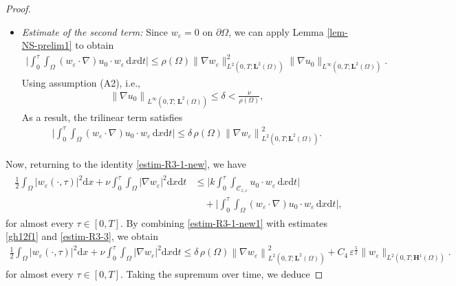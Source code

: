 \documentclass[a4paper,12pt,reqno,natbib]{amsart}
\newcommand{\dx} {\displaystyle\mathrm{d}x}
\newcommand{\dt} {\displaystyle\mathrm{d}t}
\def\H{\textbf{H}}
\def\L{\textbf{L}}
\begin{document}
\begin{proof}
\begin{itemize}
    \item[$-$] \emph{Estimate of the second term:}  
    Since \( w_\varepsilon = 0 \) on \( \partial \Omega \), we can apply Lemma \ref{lem-NS-prelim1} to obtain  
    \begin{align}
        \big| \int_0^\tau \int_\Omega (w_\varepsilon \cdot \nabla) u_0 \cdot w_\varepsilon \, \dx\dt \big|  
        \leq \rho(\Omega) \big\|\nabla w_\varepsilon\big\|_{L^2(0,T;\L^2(\Omega))}^2 \big\|\nabla u_0\big\|_{L^\infty(0,T;\L^2(\Omega))}.
    \end{align}
    Using assumption (A2), i.e.,  
    \begin{align*}
        \left\|\nabla u_0\right\|_{L^\infty(0,T;\,\L^2(\Omega))} \leq \delta < \frac{\nu}{\rho(\Omega)},
    \end{align*}
    As a result, the trilinear term satisfies  
    \begin{align}\label{estim-R3-3}
        \big| \int_0^\tau \int_\Omega (w_\varepsilon \cdot \nabla) u_0 \cdot w_\varepsilon \, \dx\dt \big|  
        \leq {\delta} \, \rho(\Omega)  \left\|\nabla w_\varepsilon\right\|^2_{L^2(0,T;\L^2(\Omega))}.
    \end{align}
\end{itemize}
Now, returning to the identity  \eqref{estim-R3-1-new}, we have
\begin{align}
\begin{split}\label{estim-R3-1-new1}
   \frac{1}{2} \int_{\Omega}\big|w_\varepsilon(\cdot,\tau)\big|^2\dx
   + \nu\int_0^{\tau}\int_\Omega\big|\nabla w_\varepsilon\big|^2\dx\dt
   &\leq\big|k\int_0^{\tau}\int_{\mathcal{C}_{z,\varepsilon}}u_0\cdot w_\varepsilon\,\dx\dt\big| \\
   &\quad+\big|\int_0^\tau\int_\Omega(w_\varepsilon \cdot \nabla)u_0\cdot w_\varepsilon\,\dx\dt\big|,
\end{split}
\end{align}
for almost every \( \tau \in [0, T] \). By combining \eqref{estim-R3-1-new1} with estimates \eqref{gh12f1} and \eqref{estim-R3-3}, we obtain
\begin{align*}
   \frac{1}{2} \int_{\Omega}\big|w_\varepsilon(\cdot,\tau)\big|^2\dx
   + \nu\int_0^{\tau}\int_\Omega\big|\nabla w_\varepsilon\big|^2\dx\dt
   \leq {\delta} \, \rho(\Omega)  \left\|\nabla w_\varepsilon\right\|^2_{L^2(0,T;\L^2(\Omega))}
   + C_4\,\varepsilon^{\frac{5}{2}} \big\|w_\varepsilon\big\|_{L^2(0,T;\H^1(\Omega))}.
\end{align*}
for almost every \( \tau \in [0, T] \). Taking the supremum over time, we deduce

\end{proof}
\end{document}
